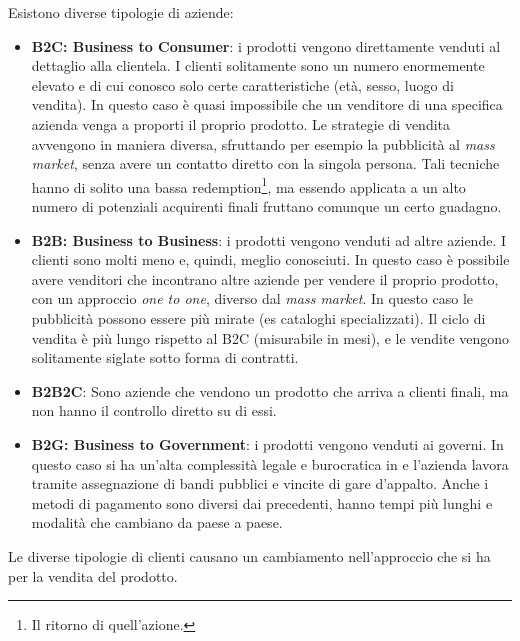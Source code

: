 Esistono diverse tipologie di aziende:
\begin{itemize}
  \item \textbf{B2C: Business to Consumer}: i prodotti vengono direttamente
  venduti al dettaglio alla clientela. I clienti solitamente sono un numero
  enormemente elevato e di cui conosco solo certe caratteristiche (età, sesso,
  luogo di vendita). In questo caso è quasi impossibile che un venditore di una
  specifica azienda venga a proporti il proprio prodotto. Le strategie di
  vendita avvengono in maniera diversa, sfruttando per esempio la pubblicità al
  \textit{mass market}, senza avere un contatto diretto con la singola persona.
  Tali tecniche hanno di solito una bassa redemption\footnote{Il ritorno di
  quell'azione.}, ma essendo applicata a un alto numero di potenziali
  acquirenti finali fruttano comunque un certo guadagno.

  \item \textbf{B2B: Business to Business}: i prodotti vengono venduti ad altre
  aziende. I clienti sono molti meno e, quindi, meglio conosciuti. In questo
  caso è possibile avere venditori che incontrano altre aziende per vendere il
  proprio prodotto, con un approccio \textit{one to one}, diverso dal
  \textit{mass market}. In questo caso le pubblicità possono essere più mirate
  (es cataloghi specializzati). Il ciclo di vendita è più lungo rispetto al B2C
  (misurabile in mesi), e le vendite vengono solitamente siglate sotto forma di
  contratti.

  \item \textbf{B2B2C}: Sono aziende che vendono un prodotto che arriva a
  clienti finali, ma non hanno il controllo diretto su di essi.

  \item \textbf{B2G: Business to Government}: i prodotti vengono venduti ai
  governi. In questo caso si ha un'alta complessità legale e burocratica in e
  l'azienda lavora tramite assegnazione di bandi pubblici e vincite di gare
  d'appalto. Anche i metodi di pagamento sono diversi dai precedenti, hanno
  tempi più lunghi e modalità che cambiano da paese a paese.
\end{itemize}

Le diverse tipologie di clienti causano un cambiamento nell'approccio che si ha
per la vendita del prodotto.
